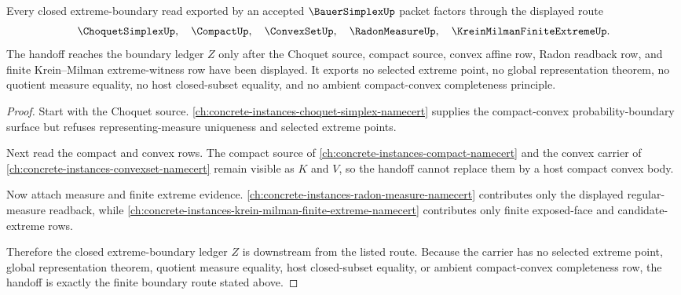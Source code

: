 \begin{theorem}
\label{thm:bauer-simplex-closed-extreme-boundary-handoff}
Every closed extreme-boundary read exported by an accepted $\BauerSimplexUp$
packet factors through the displayed route
$$
\ChoquetSimplexUp,\quad \CompactUp,\quad \ConvexSetUp,\quad
\RadonMeasureUp,\quad \KreinMilmanFiniteExtremeUp .
$$
The handoff reaches the boundary ledger $Z$ only after the Choquet source,
compact source, convex affine row, Radon readback row, and finite
Krein--Milman extreme-witness row have been displayed. It exports no selected
extreme point, no global representation theorem, no quotient measure equality,
no host closed-subset equality, and no ambient compact-convex completeness
principle.
\end{theorem}
\begin{proof}
Start with the Choquet source. \autoref{ch:concrete-instances-choquet-simplex-namecert} supplies the compact-convex probability-boundary surface but refuses representing-measure uniqueness and selected extreme points.

Next read the compact and convex rows. The compact source of \autoref{ch:concrete-instances-compact-namecert} and the convex carrier of \autoref{ch:concrete-instances-convexset-namecert} remain visible as $K$ and $V$, so the handoff cannot replace them by a host compact convex body.

Now attach measure and finite extreme evidence. \autoref{ch:concrete-instances-radon-measure-namecert} contributes only the displayed regular-measure readback, while \autoref{ch:concrete-instances-krein-milman-finite-extreme-namecert} contributes only finite exposed-face and candidate-extreme rows.

Therefore the closed extreme-boundary ledger $Z$ is downstream from the listed route. Because the carrier has no selected extreme point, global representation theorem, quotient measure equality, host closed-subset equality, or ambient compact-convex completeness row, the handoff is exactly the finite boundary route stated above.
\end{proof}



